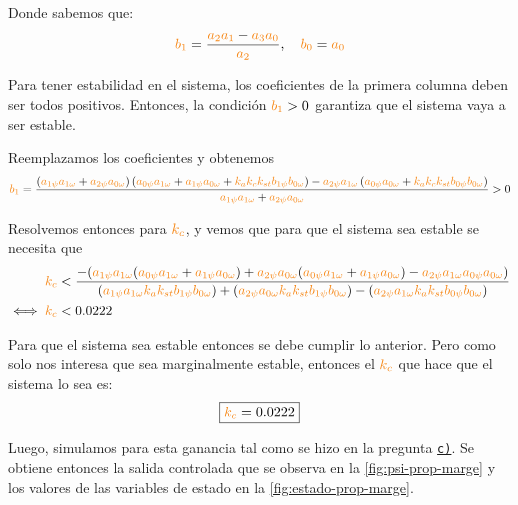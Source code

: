 Donde sabemos que:
\begin{align}
  \nara{b_1} = \frac{\nara{a_2 a_1} - \nara{a_3 a_0}}{\nara{a_2}},\quad
  \nara{b_0} = \nara{a_0}
\end{align}

Para tener estabilidad en el sistema, los coeficientes de la primera columna
deben ser todos positivos. Entonces, la condición $\nara{b_1} > 0$ garantiza
que el sistema vaya a ser estable.

Reemplazamos los coeficientes y obtenemos
\begin{equation}
    \nara{b_1}=\frac{
        \left(\nara{a_{1\psi} a_{1\omega}} + \nara{a_{2\psi} a_{0\omega}}\right)
        \left(\nara{a_{0\psi} a_{1\omega}} + \nara{a_{1\psi} a_{0\omega}} + \nara{k_a k_c k_{st} b_{1\psi} b_{0\omega}}\right) 
        - \nara{a_{2\psi} a_{1\omega}} 
        \left(\nara{a_{0\psi} a_{0\omega}} + \nara{k_a k_c k_{st} b_{0\psi} b_{0\omega}}\right)
    }{
        \nara{a_{1\psi} a_{1\omega}} + \nara{a_{2\psi} a_{0\omega}}
    } > 0
\end{equation}

Resolvemos entonces para $\nara{k_{c}}$, y vemos que para que el sistema sea
estable se necesita que
\begin{align}
       \nara{k_{c}} &< \dfrac{-(\nara{a_{1\psi} a_{1\omega}}(\nara{a_{0\psi} a_{1\omega}} + \nara{a_{1\psi} a_{0\omega}}) + \nara{ a_{2\psi} a_{0\omega} }(\nara{a_{0\psi} a_{1\omega}} + \nara{a_{1\psi} a_{0\omega}}) - \nara{a_{2\psi} a_{1\omega} a_{0\psi} a_{0\omega}})}  {(\nara{a_{1\psi} a_{1\omega} k_a k_{st} b_{1\psi} b_{0\omega}}) + (\nara{a_{2\psi} a_{0\omega} k_a k_{st} b_{1\psi} b_{0\omega}}) - (\nara{a_{2\psi} a_{1\omega} k_a k_{st} b_{0\psi} b_{0\omega}})} \\
  \iff \nara{k_{c}} &< 0.0222
\end{align}

Para que el sistema sea estable entonces se debe cumplir lo anterior. Pero
como solo nos interesa que sea marginalmente estable, entonces el $\nara{k_{c}}$
que hace que el sistema lo sea es:
\begin{equation}
    \boxed{\nara{k_c} = 0.0222}
\end{equation}

Luego, simulamos para esta ganancia tal como se hizo en la pregunta \hyperref[pregunta-c]{\texttt{c)}}.
Se obtiene entonces la salida controlada que se observa en la \autoref{fig:psi-prop-marge}
y los valores de las variables de estado en la \autoref{fig:estado-prop-marge}.

